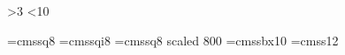 \ifnum{}
  \@dst@in@oct@or@mar 
\else
  \ifnum\month>3
    \ifnum\month<10
      \dsttrue
    \else
      \ifnum{}
        \@dst@in@oct@or@mar
      \fi
    \fi
  \fi
\fi

\def\isotz{%
-\ifdst700\else800\fi} %

\def\isotime{\begingroup%
  \count0 = \time\divide\count0 by 60 %
  \count2 = \count0 %
  \count4 = \time\multiply\count0 by 60 %
  \advance\count4 by -\count0 %
  \pad@one@zero{\count2}:\pad@one@zero{\count4}:00\isotz %
\endgroup}

\def\isodatetime{\isodate T\isotime}

\def\@maketitleaddenda{\mbox{Compiled: {\tt\isodatetime}}}


\def\@journal[#1]#2{\emph{\frenchspacing#1}}
\def\@@journal#1{\@journal[#1]{}}
\def\journal{\@ifnextchar[\@journal\@@journal}
\def\volume{\textbf}

\def\doi#1{\texttt{doi:#1}}

\font\eightss=cmssq8
\font\eightssi=cmssqi8
\font\sixss=cmssq8 scaled 800
\font\tenssbx=cmssbx10
\font\twelvess=cmss12


\def\chapterquotes{
  \baselineskip 10pt
  \parfillskip \z@
  \interlinepenalty 10000
  \leftskip \z@ plus 40pc minus \parindent
  \let\rm=\eightss \let\sl=\eightssi \let\adbcfont=\sixss \let\em=\sl
  \everypar{\sl}
  \def\from{\par\nobreak\smallskip\noindent\rm--- }
  \def\author##1(##2){\from ##1\unskip\enspace(##2)}
  \def\\{\hskip.05em} %
  \obeylines}
\def\endchapterquotes{}


\def\theorembreak{%
  \spaceleft=\vsize%
  \advance\spaceleft by-\pagetotal%
  \ifdim\spaceleft<0pt%
    \smallbreak%
  \else\ifdim\spaceleft<0.5in%
      \vfill\eject%
    \else%
      \smallbreak%
    \fi%
  \fi
}

